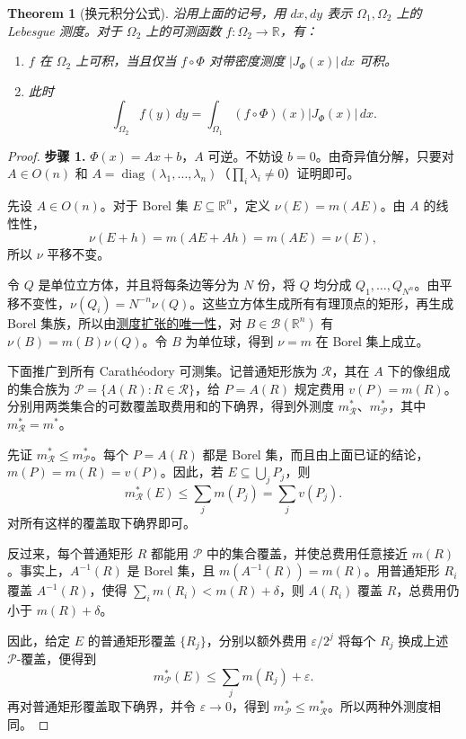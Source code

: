 \documentclass[12pt,letterpaper,twoside,openright]{ctexbook}
\theoremstyle{bluehead}
\newtheorem{theorem}{Theorem}
\theoremstyle{olivehead}
\theoremstyle{orangehead}
\theoremstyle{redremark}
\begin{document}
\begin{theorem}[换元积分公式]\label{thm:change-of-variables}
沿用上面的记号，用 $dx,dy$ 表示 $\Omega_1,\Omega_2$ 上的 Lebesgue 测度。对于 $\Omega_2$ 上的可测函数 $f:\Omega_2\to\mathbb R$，有：
\begin{enumerate}
\item[(1)] $f$ 在 $\Omega_2$ 上可积，当且仅当 $f\circ\Phi$ 对带密度测度 $|J_\Phi(x)|\,dx$ 可积。
\item[(2)] 此时
\[
\int_{\Omega_2}f(y)\,dy
=\int_{\Omega_1}(f\circ\Phi)(x)|J_\Phi(x)|\,dx.
\]
\end{enumerate}
\end{theorem}

\begin{proof}
\textbf{步骤 1.} $\Phi(x)=Ax+b$，$A$ 可逆。不妨设 $b=0$。由奇异值分解，只要对 $A\in O(n)$ 和 $A=\operatorname{diag}(\lambda_1,\ldots,\lambda_n)$（$\prod_i\lambda_i\ne0$）证明即可。

先设 $A\in O(n)$。对于 Borel 集 $E\subseteq\mathbb R^n$，定义 $\nu(E)=m(AE)$。由 $A$ 的线性性，
\[
\nu(E+h)=m(AE+Ah)=m(AE)=\nu(E),
\]
所以 $\nu$ 平移不变。

令 $Q$ 是单位立方体，并且将每条边等分为 $N$ 份，将 $Q$ 均分成 $Q_1,\ldots,Q_{N^n}$。由平移不变性，$\nu(Q_i)=N^{-n}\nu(Q)$。这些立方体生成所有有理顶点的矩形，再生成 Borel 集族，所以由\hyperref[thm:measure-extension-uniqueness]{测度扩张的唯一性}，对 $B\in\mathcal B(\mathbb R^n)$ 有 $\nu(B)=m(B)\nu(Q)$。令 $B$ 为单位球，得到 $\nu=m$ 在 Borel 集上成立。

下面推广到所有 Carathéodory 可测集。记普通矩形族为 $\mathcal R$，其在 $A$ 下的像组成的集合族为 $\mathcal P=\{A(R):R\in\mathcal R\}$，给 $P=A(R)$ 规定费用 $v(P)=m(R)$。分别用两类集合的可数覆盖取费用和的下确界，得到外测度 $m_{\mathcal R}^*$、$m_{\mathcal P}^*$，其中 $m_{\mathcal R}^*=m^*$。

先证 $m_{\mathcal R}^*\leq m_{\mathcal P}^*$。每个 $P=A(R)$ 都是 Borel 集，而且由上面已证的结论，$m(P)=m(R)=v(P)$。因此，若 $E\subseteq\bigcup_jP_j$，则
\[
m_{\mathcal R}^*(E)\leq\sum_jm(P_j)=\sum_jv(P_j).
\]
对所有这样的覆盖取下确界即可。

反过来，每个普通矩形 $R$ 都能用 $\mathcal P$ 中的集合覆盖，并使总费用任意接近 $m(R)$。事实上，$A^{-1}(R)$ 是 Borel 集，且 $m(A^{-1}(R))=m(R)$。用普通矩形 $R_i$ 覆盖 $A^{-1}(R)$，使得 $\sum_i m(R_i)<m(R)+\delta$，则 $A(R_i)$ 覆盖 $R$，总费用仍小于 $m(R)+\delta$。

因此，给定 $E$ 的普通矩形覆盖 $\{R_j\}$，分别以额外费用 $\varepsilon/2^j$ 将每个 $R_j$ 换成上述 $\mathcal P$-覆盖，便得到
\[
m_{\mathcal P}^*(E)\leq\sum_jm(R_j)+\varepsilon.
\]
再对普通矩形覆盖取下确界，并令 $\varepsilon\to0$，得到 $m_{\mathcal P}^*\leq m_{\mathcal R}^*$。所以两种外测度相同。


\end{proof}
\end{document}
